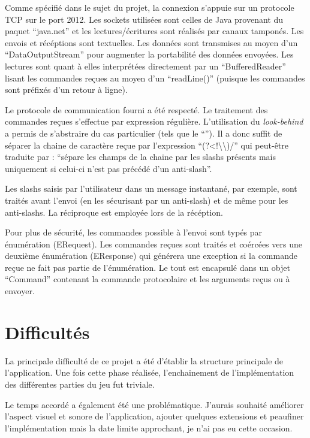 \documentclass[a4paper, 11pt]{report}
\begin{document}
Comme spécifié dans le sujet du projet, la connexion s'appuie sur un protocole TCP sur le port 2012.
Les sockets utilisées sont celles de Java provenant du paquet ``java.net'' 
et les lectures/écritures sont réalisés par canaux tamponés. Les envois et récéptions 
sont textuelles. Les données sont transmises au moyen d'un ``DataOutputStream'' pour augmenter 
la portabilité des données envoyées.
Les lectures sont quant à elles interprétées directement par un ``BufferedReader'' lisant
les commandes reçues au moyen d'un ``readLine()'' (puisque les commandes sont préfixés d'un retour 
à ligne).

Le protocole de communication fourni a été respecté. Le traitement des commandes 
reçues s'effectue par expression régulière. L'utilisation du \emph{look-behind} a permis 
de s'abstraire du cas particulier (tels que le ``\/''). Il a donc suffit de séparer la
chaine de caractère reçue par l'expression ``(?<!\textbackslash{}\textbackslash{})/'' qui peut-être traduite par :
``sépare les champs de la chaine par les slashs présents mais uniquement si celui-ci n'est pas précédé
d'un anti-slash''.

Les slashs saisis par l'utilisateur dans un message instantané, par exemple, sont traités avant 
l'envoi (en les sécurisant par un anti-slash) et de même pour les anti-slashs. La réciproque est 
employée lors de la récéption.

Pour plus de sécurité, les commandes possible à l'envoi sont typés par énumération (ERequest).
Les commandes reçues sont traités et coércées vers une deuxième énumération (EResponse) qui 
générera une exception si la commande reçue ne fait pas partie de l'énumération. 
Le tout est encapsulé dans un objet ``Command'' contenant la commande protocolaire et les arguments
reçus ou à envoyer.

\section{Difficultés}

La principale difficulté de ce projet a été d'établir la structure principale de l'application.
Une fois cette phase réalisée, l'enchainement de l'implémentation des différentes parties
du jeu fut triviale.

Le temps accordé a également été une problématique. J'aurais souhaité améliorer l'aspect visuel 
et sonore de l'application, ajouter quelques extensions et peaufiner l'implémentation 
mais la date limite approchant, je n'ai pas eu cette occasion.
\end{document}
